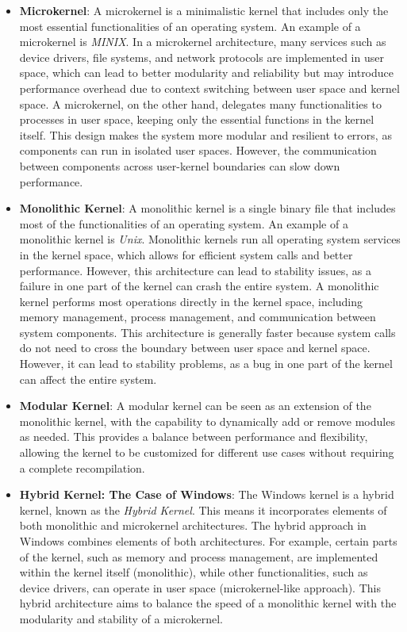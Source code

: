 \begin{itemize}
    \item \textbf{Microkernel}:
    A microkernel is a minimalistic kernel that includes only the most essential functionalities of an operating system. An example of a microkernel is \textit{MINIX}. In a microkernel architecture, many services such as device drivers, file systems, and network protocols are implemented in user space, which can lead to better modularity and reliability but may introduce performance overhead due to context switching between user space and kernel space.
    A microkernel, on the other hand, delegates many functionalities to processes in user space, keeping only the essential functions in the kernel itself. This design makes the system more modular and resilient to errors, as components can run in isolated user spaces. However, the communication between components across user-kernel boundaries can slow down performance.
    \item \textbf{Monolithic Kernel}:
    A monolithic kernel is a single binary file that includes most of the functionalities of an operating system. An example of a monolithic kernel is \textit{Unix}. Monolithic kernels run all operating system services in the kernel space, which allows for efficient system calls and better performance. However, this architecture can lead to stability issues, as a failure in one part of the kernel can crash the entire system.
    A monolithic kernel performs most operations directly in the kernel space, including memory management, process management, and communication between system components. This architecture is generally faster because system calls do not need to cross the boundary between user space and kernel space. However, it can lead to stability problems, as a bug in one part of the kernel can affect the entire system.
    \item \textbf{Modular Kernel}:
    A modular kernel can be seen as an extension of the monolithic kernel, with the capability to dynamically add or remove modules as needed. This provides a balance between performance and flexibility, allowing the kernel to be customized for different use cases without requiring a complete recompilation.
    \item \textbf{Hybrid Kernel: The Case of Windows}:
    The Windows kernel is a hybrid kernel, known as the \textit{Hybrid Kernel}. This means it incorporates elements of both monolithic and microkernel architectures.
    The hybrid approach in Windows combines elements of both architectures. For example, certain parts of the kernel, such as memory and process management, are implemented within the kernel itself (monolithic), while other functionalities, such as device drivers, can operate in user space (microkernel-like approach). This hybrid architecture aims to balance the speed of a monolithic kernel with the modularity and stability of a microkernel.
\end{itemize}


